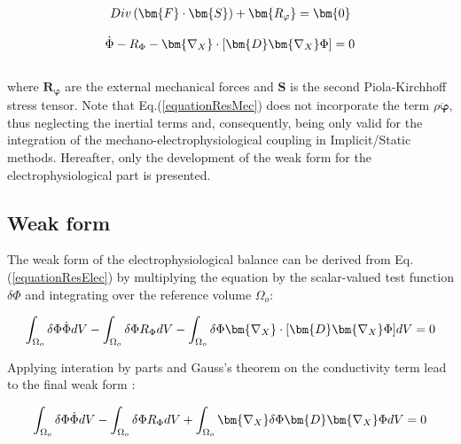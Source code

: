 \documentclass[oneside,11pt,times]{book}
\begin{document}
\begin{equation}
\begin{aligned}
\centering
Div\left(\bm{F}\cdot\bm{S}\right)+\bm{R_{\varphi}}=\bm{0}
\end{aligned}
\label{equationResMec}
\end{equation}

\begin{equation}
\begin{aligned}
\centering
\dot{\Phi} -R_{\Phi}-\bm{\nabla_{X}}\cdot[\bm{D}\bm{\nabla_{X}}\Phi]=0
\end{aligned}
\label{equationResElec}
\end{equation}
\\
where $\bm{R_{\varphi}}$ are the external mechanical forces and $\bm{S}$ is the second Piola-Kirchhoff stress tensor. Note that Eq.(\ref{equationResMec}) does not incorporate the term $\rho\bm{\ddot{\varphi}}$, thus neglecting the inertial terms and, consequently, being only valid for the integration of the mechano-electrophysiological coupling in Implicit/Static methods. Hereafter, only the development of the weak form for the electrophysiological part is presented.\\

\subsection{Weak form}
The weak form of the electrophysiological balance can be derived from Eq.(\ref{equationResElec}) by multiplying the equation by the scalar-valued test function $\delta\Phi$ and integrating over the reference volume $\Omega_{o}$:

\begin{equation}
\begin{aligned}
\centering
\int_{\Omega_{o}}\delta\Phi\dot{\Phi} dV-\int_{\Omega_{o}} \delta\Phi R_{\Phi}dV-\int_{\Omega_{o}}\delta\Phi\bm{\nabla_{X}}\cdot[\bm{D}\bm{\nabla_{X}}\Phi] dV=0
\end{aligned}
\end{equation}

Applying interation by parts and Gauss's theorem on the conductivity term lead to the final weak form :

\begin{equation}
\begin{aligned}
\centering
\int_{\Omega_{o}}\delta\Phi\dot{\Phi} dV-\int_{\Omega_{o}} \delta\Phi R_{\Phi}dV+\int_{\Omega_{o}}\bm{\nabla_{X}}\delta\Phi\bm{D}\bm{\nabla_{X}}\Phi dV=0
\end{aligned}
\label{equationWeakForm}
\end{equation}
\end{document}
